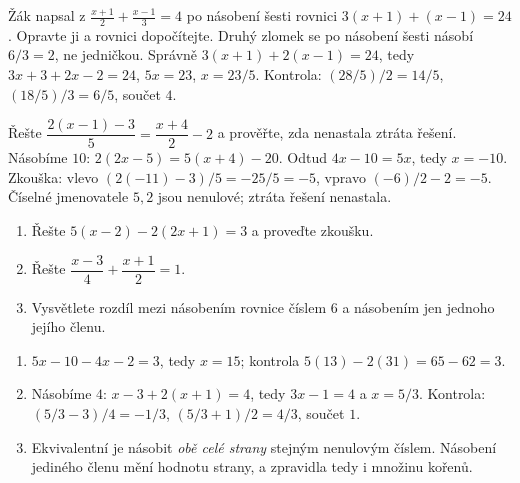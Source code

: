 \documentclass[11pt,a4paper]{article}
\begin{document}
\begin{zadaniReseniBox}
Žák napsal z $\frac{x+1}{2}+\frac{x-1}{3}=4$ po násobení šesti rovnici $3(x+1)+(x-1)=24$. Opravte ji a rovnici dopočítejte.
\tcblower
Druhý zlomek se po násobení šesti násobí $6/3=2$, ne jedničkou. Správně $3(x+1)+2(x-1)=24$, tedy $3x+3+2x-2=24$, $5x=23$, $x=23/5$. Kontrola: $(28/5)/2=14/5$, $(18/5)/3=6/5$, součet $4$.
\end{zadaniReseniBox}
\begin{zadaniReseniBox}
Řešte $\dfrac{2(x-1)-3}{5}=\dfrac{x+4}{2}-2$ a prověřte, zda nenastala ztráta řešení.
\tcblower
Násobíme $10$: $2(2x-5)=5(x+4)-20$. Odtud $4x-10=5x$, tedy $x=-10$. Zkouška: vlevo $(2(-11)-3)/5=-25/5=-5$, vpravo $(-6)/2-2=-5$. Číselné jmenovatele $5,2$ jsou nenulové; ztráta řešení nenastala.
\end{zadaniReseniBox}
\begin{zadaniReseniBox}
\begin{enumerate}[label=\alph*)]
\item Řešte $5(x-2)-2(2x+1)=3$ a proveďte zkoušku.
\item Řešte $\dfrac{x-3}{4}+\dfrac{x+1}{2}=1$.
\item Vysvětlete rozdíl mezi násobením rovnice číslem $6$ a násobením jen jednoho jejího členu.
\end{enumerate}
\tcblower
\begin{enumerate}[label=\alph*)]
\item $5x-10-4x-2=3$, tedy $x=15$; kontrola $5(13)-2(31)=65-62=3$.
\item Násobíme $4$: $x-3+2(x+1)=4$, tedy $3x-1=4$ a $x=5/3$. Kontrola: $(5/3-3)/4=-1/3$, $(5/3+1)/2=4/3$, součet $1$.
\item Ekvivalentní je násobit \emph{obě celé strany} stejným nenulovým číslem. Násobení jediného členu mění hodnotu strany, a zpravidla tedy i množinu kořenů.
\end{enumerate}
\end{zadaniReseniBox}
\end{document}

